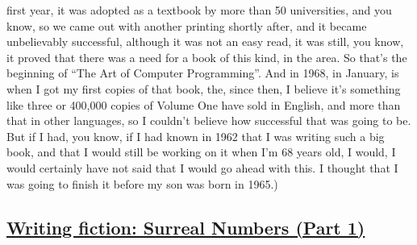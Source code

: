 \documentclass[]{article}
\begin{document}
first year, it was adopted as a textbook by more than 50 universities,
and you know, so we came out with another printing shortly after, and it
became unbelievably successful, although it was not an easy read, it was
still, you know, it proved that there was a need for a book of this
kind, in the area. So that's the beginning of ``The Art of Computer
Programming''. And in 1968, in January, is when I got my first copies of
that book, the, since then, I believe it's something like three or
400,000 copies of Volume One have sold in English, and more than that in
other languages, so I couldn't believe how successful that was going to
be. But if I had, you know, if I had known in 1962 that I was writing
such a big book, and that I would still be working on it when I'm 68
years old, I would, I would certainly have not said that I would go
ahead with this. I thought that I was going to finish it before my son
was born in 1965.)

\subsection{\texorpdfstring{\href{http://webofstories.com/play/17099}{Writing
fiction: Surreal Numbers (Part
1)}}{Writing fiction: Surreal Numbers (Part 1)}}\label{writing-fiction-surreal-numbers-part-1}
\end{document}
